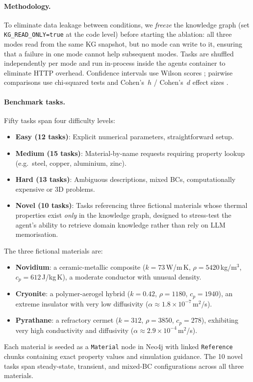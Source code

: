 \documentclass[preprint,review,12pt]{elsarticle}
\begin{document}
\paragraph{Methodology.}
To eliminate data leakage between conditions, we \emph{freeze} the
knowledge graph (set \texttt{KG\_READ\_ONLY=true} at the code level)
before starting the ablation: all three modes read from the same KG
snapshot, but no mode can write to it, ensuring that a failure in one
mode cannot help subsequent modes.
Tasks are shuffled independently per mode and run in-process inside the
agents container to eliminate HTTP overhead.
Confidence intervals use Wilson scores \citep{wilson1927}; pairwise
comparisons use chi-squared tests and Cohen's~$h$ / Cohen's~$d$ effect
sizes \citep{cohen1988}.

\paragraph{Benchmark tasks.}
Fifty tasks span four difficulty levels:
\begin{itemize}
  \item \textbf{Easy (12 tasks)}: Explicit numerical parameters, straightforward setup.
  \item \textbf{Medium (15 tasks)}: Material-by-name requests requiring
        property lookup (e.g.\ steel, copper, aluminium, zinc).
  \item \textbf{Hard (13 tasks)}: Ambiguous descriptions, mixed BCs,
        computationally expensive or 3D problems.
  \item \textbf{Novel (10 tasks)}: Tasks referencing three fictional
        materials whose thermal properties exist \emph{only} in the
        knowledge graph, designed to stress-test the agent's ability
        to retrieve domain knowledge rather than rely on LLM memorisation.
\end{itemize}

The three fictional materials are:
\begin{itemize}
  \item \textbf{Novidium}: a ceramic-metallic composite ($k{=}73$\,W/m\,K,
        $\rho{=}5420$\,kg/m$^3$, $c_p{=}612$\,J/kg\,K),
        a moderate conductor with unusual density.
  \item \textbf{Cryonite}: a polymer-aerogel hybrid ($k{=}0.42$,
        $\rho{=}1180$, $c_p{=}1940$), an extreme insulator with
        very low diffusivity ($\alpha \approx 1.8{\times}10^{-7}$\,m$^2$/s).
  \item \textbf{Pyrathane}: a refractory cermet ($k{=}312$,
        $\rho{=}3850$, $c_p{=}278$), exhibiting very high conductivity
        and diffusivity ($\alpha \approx 2.9{\times}10^{-4}$\,m$^2$/s).
\end{itemize}
Each material is seeded as a \texttt{Material} node in Neo4j with linked
\texttt{Reference} chunks containing exact property values and
simulation guidance.  The 10 novel tasks span steady-state, transient,
and mixed-BC configurations across all three materials.
\end{document}
